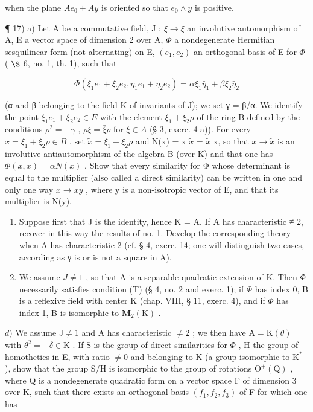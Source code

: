 when the plane \(Ae_{0} + Ay\) is oriented so that \(e_{0} \wedge y\) is positive.

¶ 17) a) Let A be a commutative field, J : \(\xi \to \overline{\xi}\) an involutive automorphism of A, E a vector space of dimension 2 over A, \(\Phi\) a nondegenerate Hermitian sesquilinear form (not alternating) on E, \((e_1, e_2)\) an orthogonal basis of E for \(\Phi\) ( \(\S\) 6, no. 1, th. 1), such that

\[
\Phi (\xi_ {1} e _ {1} + \xi_ {2} e _ {2}, \eta_ {1} e _ {1} + \eta_ {2} e _ {2}) = \alpha \xi_ {1} \bar {\eta} _ {1} + \beta \xi_ {2} \bar {\eta} _ {2}
\]

(α and β belonging to the field K of invariants of J); we set γ = β/α. We identify the point \(\xi_{1}e_{1} + \xi_{2}e_{2} \in E\) with the element \(\xi_{1} + \xi_{2}\rho\) of the ring B defined by the conditions \(\rho^{2} = -\gamma\) , \(\rho\xi = \bar{\xi}\rho\) for \(\xi \in A\) (§ 3, exerc. 4 a)). For every \(x = \xi_{1} + \xi_{2}\rho \in B\) , set \(\tilde{x} = \bar{\xi}_{1} - \xi_{2}\rho\) and N(x) = x \(\tilde{x}\) = \(\tilde{x}\) x, so that \(x \to \tilde{x}\) is an involutive antiautomorphism of the algebra B (over K) and that one has \(\Phi(x, x) = \alpha N(x)\) . Show that every similarity for Φ whose determinant is equal to the multiplier (also called a direct similarity) can be written in one and only one way \(x \to xy\) , where y is a non-isotropic vector of E, and that its multiplier is N(y).

\begin{enumerate}
\def\labelenumi{\alph{enumi})}
\setcounter{enumi}{1}
\item
  Suppose first that J is the identity, hence K = A. If A has characteristic ≠ 2, recover in this way the results of no. 1. Develop the corresponding theory when A has characteristic 2 (cf. § 4, exerc. 14; one will distinguish two cases, according as γ is or is not a square in A).
\item
  We assume \(J \neq 1\) , so that A is a separable quadratic extension of K. Then \(\Phi\) necessarily satisfies condition (T) (§ 4, no. 2 and exerc. 1); if \(\Phi\) has index 0, B is a reflexive field with center K (chap. VIII, § 11, exerc. 4), and if \(\Phi\) has index 1, B is isomorphic to \(\mathbf{M}_2(\mathrm{K})\) .
\end{enumerate}

\(d)\) We assume \(\mathrm{J} \neq 1\) and A has characteristic \(\neq 2\) ; we then have \(\mathrm{A} = \mathrm{K}(\theta)\) with \(\theta^2 = -\delta \in \mathrm{K}\) . If S is the group of direct similarities for \(\Phi\) , H the group of homotheties in E, with ratio \(\neq 0\) and belonging to K (a group isomorphic to \(\mathrm{K}^*\) ), show that the group S/H is isomorphic to the group of rotations \(\mathrm{O}^+(\mathrm{Q})\) , where Q is a nondegenerate quadratic form on a vector space F of dimension 3 over K, such that there exists an orthogonal basis \((f_1, f_2, f_3)\) of F for which one has

